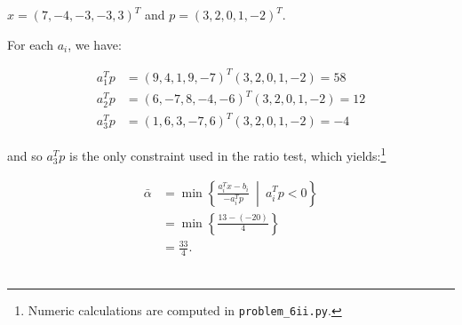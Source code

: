 $x = (7, -4, -3, -3, 3)^T$ and $p = (3, 2, 0, 1, -2)^T.$

\begin{solution}
  For each $a_i$, we have:

  \begin{align*}
    a_1^T p &= (9, 4, 1, 9, -7)^T (3, 2, 0, 1, -2) = 58 \\
    a_2^T p &= (6, -7, 8, -4, -6)^T (3, 2, 0, 1, -2) = 12 \\
    a_3^T p &= (1, 6, 3, -7, 6)^T (3, 2, 0, 1, -2) = -4
  \end{align*}

  and so $a_3^T p$ is the only constraint used in the ratio test, which yields:\footnote{
    Numeric calculations are computed in \texttt{problem\_6ii.py}.
  }

  \begin{align*}
    \bar{\alpha} &= \min \left\{ \frac{a_i^T x - b_i}{-a_i^Tp} \ \middle| \ a_i^T p < 0 \right\} \\
                 &= \min \left\{ \frac{13 - (-20)}{4} \right\} \\
                 &= \frac{33}{4}.
  \end{align*}
  \ \\
\end{solution}